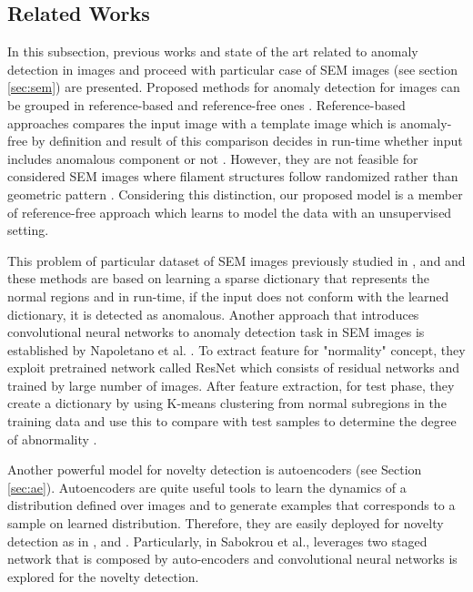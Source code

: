 \subsection{Related Works}
\label{sec:relworks}

In this subsection, previous works and state of the art related to anomaly detection in images 
and proceed with particular case of SEM images (see section \ref{sec:sem}) are presented. Proposed 
methods for anomaly detection for images can be grouped in reference-based and reference-free ones 
\cite{Chandola:2009:ADS:1541880.1541882}. Reference-based approaches compares the input image with a 
template image which is anomaly-free by definition and result of this comparison decides in run-time 
whether input includes anomalous component or not \cite{zontak2010defect}.
However, they are not feasible for considered SEM images where filament structures follow
randomized rather than geometric pattern \cite{carrera2016defect}. Considering this distinction, our proposed model 
is a member of reference-free approach which learns to model the data with an unsupervised setting.

This problem of particular dataset of SEM images previously studied in \cite{carrera2016defect},
\cite{carrera-2016-scale} and \cite{boracchi2014novelty} and these methods are based on learning a 
sparse dictionary that represents the normal regions and in run-time, if the input does not conform 
with the learned dictionary, it is detected as anomalous. Another approach that introduces convolutional 
neural networks to anomaly detection task in SEM images is established by Napoletano et al. \cite{Napoletano2018anomaly}. 
To extract feature for "normality" concept, they exploit pretrained network called ResNet \cite{he2016deep} 
which consists of residual networks and trained by large number of images. After feature extraction, 
for test phase, they create a dictionary by using K-means clustering from normal subregions in the training data 
and use this to compare with test samples to determine the degree of abnormality \cite{Napoletano2018anomaly}.

Another powerful model for novelty detection is autoencoders (see Section \ref{sec:ae}). Autoencoders are quite useful 
tools to learn the dynamics of a distribution defined over images and to generate examples that corresponds 
to a sample on learned distribution. Therefore, they are easily deployed for novelty 
detection as in \cite{an2015variational}, \cite{leveau2017adversarial} and
\cite{Pidhorskyi:2018:GPN:3327757.3327787}. Particularly, in Sabokrou et al.\cite{sabokrou2018adversarially},
leverages two staged network that is composed by auto-encoders and convolutional neural networks is explored for
the novelty detection. 

